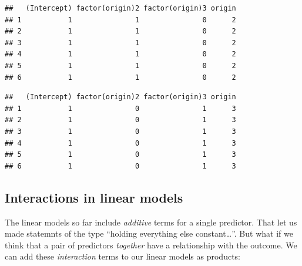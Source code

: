 \documentclass[]{article}
\newenvironment{Shaded}{\begin{snugshade}}{\end{snugshade}}
\newcommand{\KeywordTok}[1]{\textcolor[rgb]{0.13,0.29,0.53}{\textbf{{#1}}}}
\newcommand{\StringTok}[1]{\textcolor[rgb]{0.31,0.60,0.02}{{#1}}}
\newcommand{\NormalTok}[1]{{#1}}
\theoremstyle{definition}
\theoremstyle{definition}
\theoremstyle{remark}
\begin{document}
\begin{Shaded}
\end{Shaded}

\begin{verbatim}
##   (Intercept) factor(origin)2 factor(origin)3 origin
## 1           1               1               0      2
## 2           1               1               0      2
## 3           1               1               0      2
## 4           1               1               0      2
## 5           1               1               0      2
## 6           1               1               0      2
\end{verbatim}

\begin{Shaded}
\end{Shaded}

\begin{verbatim}
##   (Intercept) factor(origin)2 factor(origin)3 origin
## 1           1               0               1      3
## 2           1               0               1      3
## 3           1               0               1      3
## 4           1               0               1      3
## 5           1               0               1      3
## 6           1               0               1      3
\end{verbatim}

\subsection{Interactions in linear
models}\label{interactions-in-linear-models}

The linear models so far include \emph{additive} terms for a single
predictor. That let us made statemnts of the type ``holding everything
else constant\ldots{}''. But what if we think that a pair of predictors
\emph{together} have a relationship with the outcome. We can add these
\emph{interaction} terms to our linear models as products:
\end{document}
